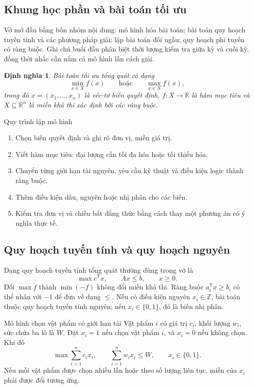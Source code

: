 \documentclass[11pt,a4paper]{article}
\newcommand{\R}{\mathbb{R}}
\newcommand{\T}{^{\mathsf T}}
\newtheorem{definition}{Định nghĩa}
\begin{document}
\subsection{Khung học phần và bài toán tối ưu}
Vở mở đầu bằng bốn nhóm nội dung: mô hình hóa bài toán; bài toán quy hoạch tuyến tính và các phương pháp giải; lập bài toán đối ngẫu; quy hoạch phi tuyến có ràng buộc. Ghi chú buổi đầu phân biệt thời lượng kiểm tra giữa kỳ và cuối kỳ, đồng thời nhắc cần nắm cả mô hình lẫn cách giải.

\begin{definition}
Bài toán tối ưu tổng quát có dạng
\[
\min_{x\in X} f(x)
\qquad\text{hoặc}\qquad
\max_{x\in X} f(x),
\]
trong đó \(x=(x_1,\ldots,x_n)\) là véc-tơ biến quyết định, \(f:X\to\R\) là hàm mục tiêu và \(X\subseteq\R^n\) là miền khả thi xác định bởi các ràng buộc.
\end{definition}

\begin{keybox}{Quy trình lập mô hình}
\begin{enumerate}
\item Chọn biến quyết định và ghi rõ đơn vị, miền giá trị.
\item Viết hàm mục tiêu: đại lượng cần tối đa hóa hoặc tối thiểu hóa.
\item Chuyển từng giới hạn tài nguyên, yêu cầu kỹ thuật và điều kiện logic thành ràng buộc.
\item Thêm điều kiện dấu, nguyên hoặc nhị phân cho các biến.
\item Kiểm tra đơn vị và chiều bất đẳng thức bằng cách thay một phương án có ý nghĩa thực tế.
\end{enumerate}
\end{keybox}

\subsection{Quy hoạch tuyến tính và quy hoạch nguyên}
Dạng quy hoạch tuyến tính tổng quát thường dùng trong vở là
\[
\max c\T x,\qquad Ax\le b,\qquad x\ge0.
\]
Đổi \(\max f\) thành \(\min(-f)\) không đổi miền khả thi. Ràng buộc \(a_i\T x\ge b_i\) có thể nhân với \(-1\) để đưa về dạng \(\le\). Nếu có điều kiện nguyên \(x_i\in\mathbb Z\), bài toán thuộc quy hoạch tuyến tính nguyên; nếu \(x_i\in\{0,1\}\), đó là biến nhị phân.

\begin{exbox}{Mô hình chọn vật phẩm có giới hạn tải}
Vật phẩm \(i\) có giá trị \(c_i\), khối lượng \(w_i\), sức chứa ba lô là \(W\). Đặt \(x_i=1\) nếu chọn vật phẩm \(i\), và \(x_i=0\) nếu không chọn. Khi đó
\[
\max \sum_{i=1}^n c_i x_i,\qquad
\sum_{i=1}^n w_i x_i\le W,\qquad
x_i\in\{0,1\}.
\]
Nếu mỗi vật phẩm được chọn nhiều lần hoặc theo số lượng liên tục, miền của \(x_i\) phải được đổi tương ứng.
\end{exbox}
\end{document}
